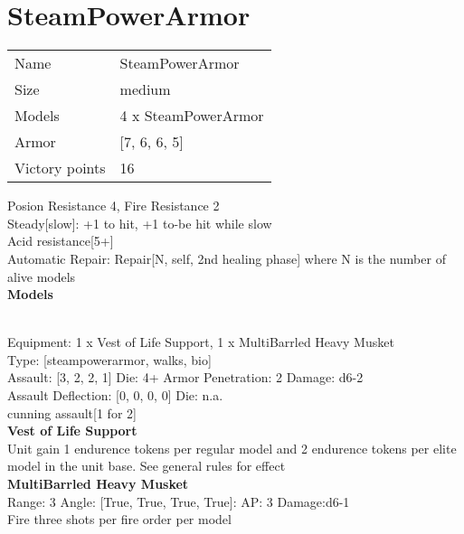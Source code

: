 \pagebreak

\section{ SteamPowerArmor }

\begin{tabular}{ll}
  Name & SteamPowerArmor \\
  Size & medium\\
  Models & 4 x SteamPowerArmor\\
  Armor & [7, 6, 6, 5]\\
  Victory points & 16\\
\end{tabular}

Posion Resistance 4, Fire Resistance 2\\ 
Steady[slow]: +1 to hit, +1 to-be hit while slow\\ 
Acid resistance[5+]\\ 
Automatic Repair: Repair[N, self, 2nd healing phase] where N is the number of alive models\\ 


{\bf Models}

 \\
Equipment: 1 x Vest of Life Support, 1 x MultiBarrled Heavy Musket \\
Type: [steampowerarmor, walks, bio] \\

Assault: [3, 2, 2, 1] Die: 4+ Armor Penetration: 2 Damage: d6-2 \\
Assault Deflection: [0, 0, 0, 0] Die: n.a.\\
\indent cunning assault[1 for 2]\\ 
 



{\bf Vest of Life Support } \\

Unit gain 1 endurence tokens per regular model  and 2 endurence tokens per elite model in the unit base. See general rules for effect\\ 





{\bf MultiBarrled Heavy Musket } \\



Range: 3  Angle: [True, True, True, True]: AP: 3 Damage:d6-1 \\
Fire three shots per fire order per model\\ 




